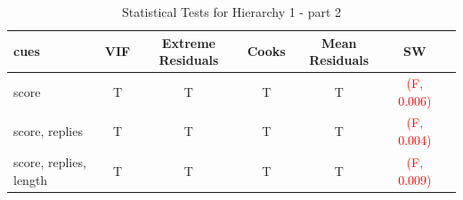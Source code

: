 \documentclass[11pt, oneside]{article}   	%
\begin{document}
\begin{table}[H]
  \begin{center}
  \begin{tabular}{|l|c|c|c|c|c|c|}
    \hline
    cues & VIF & Extreme Residuals & Cooks & Mean Residuals & SW \\
    \hline
    score  & T & T & T & T & \textcolor{red}{(F, 0.006)} \\
    score, replies & T & T & T & T & \textcolor{red}{(F, 0.004)} \\
    score, replies, length & T & T & T & T & \textcolor{red}{(F, 0.009)} \\
    \hline
  \end{tabular}
  \caption{Statistical Tests for Hierarchy 1 - part 2}
  \end{center}
\end{table}
\end{document}

